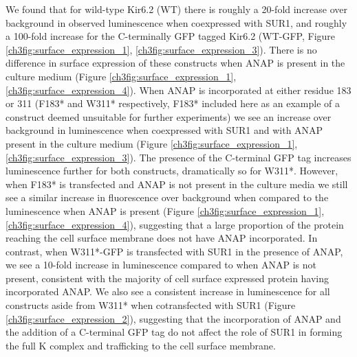 We found that for wild-type Kir6.2 (WT) there is roughly a 20-fold increase over background in observed luminescence when coexpressed with SUR1, and roughly a 100-fold increase for the C-terminally GFP tagged Kir6.2 (WT-GFP, Figure \ref{ch3fig:surface_expression_1}, \ref{ch3fig:surface_expression_3}).
There is no difference in surface expression of these constructs when ANAP is present in the culture medium (Figure \ref{ch3fig:surface_expression_1}, \ref{ch3fig:surface_expression_4}).
When ANAP is incorporated at either residue 183 or 311 (F183* and W311* respectively, F183* included here as an example of a construct deemed unsuitable for further experiments) we see an increase over background in luminescence when coexpressed with SUR1 and with ANAP present in the culture medium (Figure \ref{ch3fig:surface_expression_1}, \ref{ch3fig:surface_expression_3}).
The presence of the C-terminal GFP tag increases luminescence further for both constructs, dramatically so for W311*.
However, when F183* is transfected and ANAP is not present in the culture media we still see a similar increase in fluorescence over background when compared to the luminescence when ANAP is present (Figure \ref{ch3fig:surface_expression_1}, \ref{ch3fig:surface_expression_4}), suggesting that a large proportion of the protein reaching the cell surface membrane does not have ANAP incorporated.
In contrast, when W311*-GFP is transfected with SUR1 in the presence of ANAP, we see a 10-fold increase in luminescence compared to when ANAP is not present, consistent with the majority of cell surface expressed protein having incorporated ANAP.
We also see a consistent increase in luminescence for all constructs aside from W311* when cotransfected with SUR1 (Figure \ref{ch3fig:surface_expression_2}), suggesting that the incorporation of ANAP and the addition of a C-terminal GFP tag do not affect the role of SUR1 in forming the full K\ATP{} complex and trafficking to the cell surface membrane.

